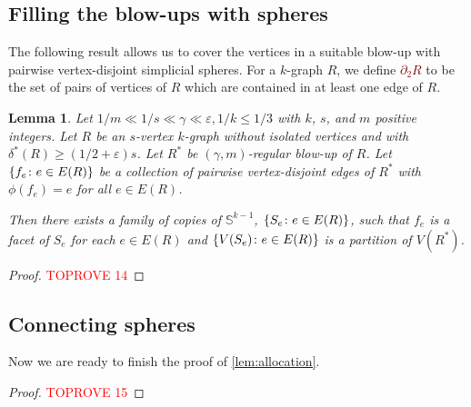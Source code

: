 \documentclass[12pt,reqno]{amsart}
\theoremstyle{plain}
\newtheorem{lemma}[theorem]{Lemma}
\theoremstyle{definition}
\numberwithin{equation}{section}
\DeclarePairedDelimiter{\set}{\{}{\}}
\renewcommand{\ge}{\geqslant}
\renewcommand{\le}{\leqslant}
\newcommand{\defn}[1]{\textcolor{Maroon}{\emph{#1}}}
\newcommand{\eps}{\varepsilon}
\newcommand{\comin}{\delta^{\ast}}
\newcommand{\bS}{\mathbb{S}}
\begin{document}
	\subsection{Filling the blow-ups with spheres}
	
	The following result allows us to cover the vertices in a suitable blow-up with pairwise vertex-disjoint simplicial spheres.
	For a $k$-graph $R$, we define \defn{$\partial_2 R$} to be the set of pairs of vertices of $R$ which are contained in at least one edge of $R$.
	
	\begin{lemma}\label{lem:filling}
		Let $1/m \ll 1/s \ll \gamma \ll \eps, 1/k \le 1/3$ with $k$, $s$, and $m$ positive integers. Let $R$ be an $s$-vertex $k$-graph without isolated vertices and with $\comin(R) \ge (1/2 + \eps)s$.
		Let $R^\ast$ be {$(\gamma, m)$-regular blow-up} of $R$.
		Let $\set{f_e \colon e \in E(R)}$ be a collection of pairwise vertex-disjoint edges of $R^\ast$ with $\phi(f_e) = e$ for all $e \in E(R)$.
		
		Then there exists a family of copies of $\bS^{k - 1}$, $\set{S_e \colon e \in E(R)}$, such that $f_e$ is a facet of $S_e$ for each $e \in E(R)$ and $\set{V(S_e) \colon e \in E(R)}$ is a partition of $V(R^\ast)$.
	\end{lemma}
	
	\begin{proof}\textcolor{red}{TOPROVE 14}\end{proof}
	
	
	\subsection{Connecting spheres}
	
	Now we are ready to finish the proof of \cref{lem:allocation}.
	
	\begin{proof}\textcolor{red}{TOPROVE 15}\end{proof}
	
\end{document}
